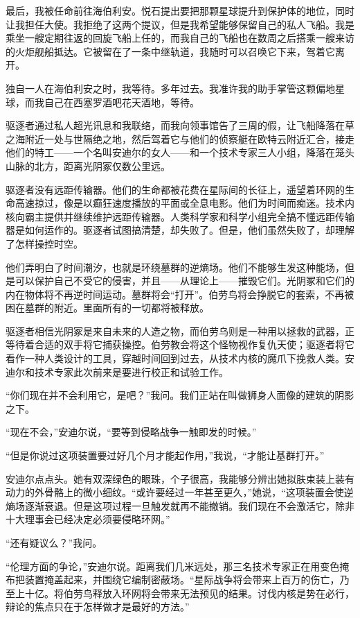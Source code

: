 \documentclass[AutoFakeBold=true]{book}
\begin{document}
{最后，我被任命前往海伯利安。悦石提出要把那颗星球提升到保护体的地位，同时让我担任大使。我拒绝了这两个提议，但是我希望能够保留自己的私人飞船。我是乘坐一艘定期往返的回旋飞船上任的，而我自己的飞船也在数周之后搭乘一艘来访的火炬舰船抵达。它被留在了一条中继轨道，我随时可以召唤它下来，驾着它离开。

独自一人在海伯利安之时，我等待。多年过去。我准许我的助手掌管这颗偏地星球，而我自己在西塞罗酒吧花天酒地，等待。

驱逐者通过私人超光讯息和我联络，而我向领事馆告了三周的假，让飞船降落在草之海附近一处与世隔绝之地，然后驾着它与他们的侦察艇在欧特云附近汇合，接走他们的特工——一个名叫安迪尔的女人——和一个技术专家三人小组，降落在笼头山脉的北方，距离光阴冢仅数公里远。

驱逐者没有远距传输器。他们的生命都被花费在星际间的长征上，遥望着环网的生命高速掠过，像是以癫狂速度播放的平面或全息电影。他们为时间而痴迷。技术内核向霸主提供并继续维护远距传输器。人类科学家和科学小组完全搞不懂远距传输器是如何运作的。驱逐者试图搞清楚，却失败了。但是，他们虽然失败了，却理解了怎样操控时空。

他们弄明白了时间潮汐，也就是环绕墓群的逆熵场。他们不能够生发这种能场，但是可以保护自己不受它的侵害，并且——从理论上——摧毁它们。光阴冢和它们的内在物体将不再逆时间运动。墓群将会``打开''。伯劳鸟将会挣脱它的套索，不再被困在墓群的附近。里面所有的一切都将被释放。

驱逐者相信光阴冢是来自未来的人造之物，而伯劳乌则是一种用以拯救的武器，正等待着合适的双手将它捕获操控。伯劳教会将这个怪物视作复仇天使；驱逐者将它看作一种人类设计的工具，穿越时间回到过去，从技术内核的魔爪下挽救人类。安迪尔和技术专家此次前来是要进行校正和试验工作。

``你们现在并不会利用它，是吧？''我问。我们正站在叫做狮身人面像的建筑的阴影之下。

``现在不会，''安迪尔说，``要等到侵略战争一触即发的时候。''

``但是你说过这项装置要过好几个月才能起作用，''我说，``才能让基群打开。''

安迪尔点点头。她有双深绿色的眼珠，个子很高，我能够分辨出她拟肤束装上装有动力的外骨骼上的微小细纹。``或许要经过一年甚至更久，''她说，``这项装置会使逆熵场逐渐衰退。但是这项过程一旦触发就再不能撤销。我们现在不会激活它，除非十大理事会已经决定必须要侵略环网。''

``还有疑议么？''我问。

``伦理方面的争论，''安迪尔说。距离我们几米远处，那三名技术专家正在用变色掩布把装置掩盖起来，并围绕它编制密蔽场。``星际战争将会带来上百万的伤亡，乃至上十亿。将伯劳鸟释放入环网将会带来无法预见的结果。讨伐内核是势在必行，辩论的焦点只在于怎样做才是最好的方法。''

}
\end{document}
